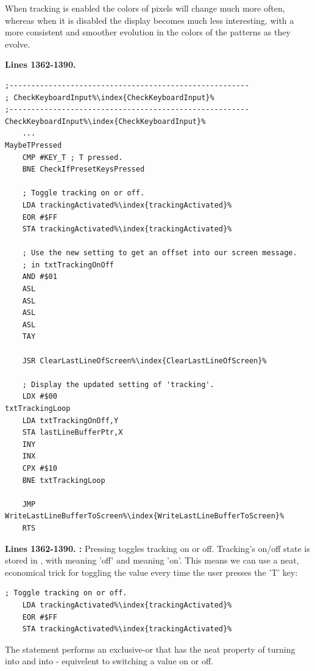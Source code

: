 When tracking is enabled the colors of pixels will change much more often, whereas when it is disabled
the display becomes much less interesting, with a more consistent and smoother evolution in the colors
of the patterns as they evolve.

\clearpage
\textbf{Lines 1362-1390. } 
\begin{lstlisting}[escapechar=\%]
;-------------------------------------------------------
; CheckKeyboardInput%\index{CheckKeyboardInput}%
;-------------------------------------------------------
CheckKeyboardInput%\index{CheckKeyboardInput}%   
    ...
MaybeTPressed   
    CMP #KEY_T ; T pressed.
    BNE CheckIfPresetKeysPressed

    ; Toggle tracking on or off.
    LDA trackingActivated%\index{trackingActivated}%
    EOR #$FF
    STA trackingActivated%\index{trackingActivated}%

    ; Use the new setting to get an offset into our screen message.
    ; in txtTrackingOnOff
    AND #$01
    ASL 
    ASL 
    ASL 
    ASL 
    TAY 

    JSR ClearLastLineOfScreen%\index{ClearLastLineOfScreen}%

    ; Display the updated setting of 'tracking'.
    LDX #$00
txtTrackingLoop   
    LDA txtTrackingOnOff,Y
    STA lastLineBufferPtr,X
    INY 
    INX 
    CPX #$10
    BNE txtTrackingLoop

    JMP WriteLastLineBufferToScreen%\index{WriteLastLineBufferToScreen}%
    RTS 
\end{lstlisting}
\clearpage

\textbf{Lines 1362-1390. :} 
Pressing  toggles tracking on or off. Tracking's on/off state is 
stored in , with  meaning 'off' and
 meaning 'on'. This means we can use a neat, economical trick
for toggling the value every time the user presses the 'T' key:

\begin{lstlisting}[escapechar=\%]
    ; Toggle tracking on or off.
    LDA trackingActivated%\index{trackingActivated}%
    EOR #$FF
    STA trackingActivated%\index{trackingActivated}%
\end{lstlisting}

The  statement performs an exclusive-or that has the neat property of
turning  into  and  into  - equivelent
to switching a value on or off.

